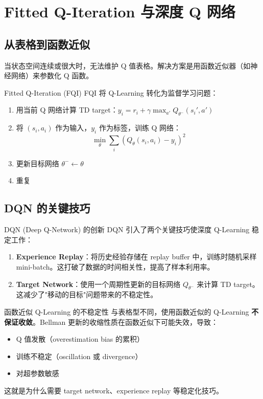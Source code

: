 \section{Fitted Q-Iteration 与深度 Q 网络}

\subsection{从表格到函数近似}

当状态空间连续或很大时，无法维护 Q 值表格。解决方案是用函数近似器（如神经网络）来参数化 Q 函数。

\begin{importantbox}{Fitted Q-Iteration (FQI)}
FQI 将 Q-Learning 转化为监督学习问题：
\begin{enumerate}
    \item 用当前 Q 网络计算 TD target：$y_i = r_i + \gamma \max_{a'} Q_{\theta^-}(s_i', a')$
    \item 将 $(s_i, a_i)$ 作为输入，$y_i$ 作为标签，训练 Q 网络：
    $$\min_\theta \sum_i \left(Q_\theta(s_i, a_i) - y_i\right)^2$$
    \item 更新目标网络 $\theta^- \leftarrow \theta$
    \item 重复
\end{enumerate}
\end{importantbox}

\subsection{DQN 的关键技巧}

\begin{importantbox}{DQN (Deep Q-Network) 的创新}
DQN 引入了两个关键技巧使深度 Q-Learning 稳定工作：
\begin{enumerate}
    \item \textbf{Experience Replay}：将历史经验存储在 replay buffer 中，训练时随机采样 mini-batch。这打破了数据的时间相关性，提高了样本利用率。
    \item \textbf{Target Network}：使用一个周期性更新的目标网络 $Q_{\theta^-}$ 来计算 TD target。这减少了"移动的目标"问题带来的不稳定性。
\end{enumerate}
\end{importantbox}

\begin{warningbox}{函数近似 Q-Learning 的不稳定性}
与表格型不同，使用函数近似的 Q-Learning \textbf{不保证收敛}。Bellman 更新的收缩性质在函数近似下可能失效，导致：
\begin{itemize}
    \item Q 值发散（overestimation bias 的累积）
    \item 训练不稳定（oscillation 或 divergence）
    \item 对超参数敏感
\end{itemize}
这就是为什么需要 target network、experience replay 等稳定化技巧。
\end{warningbox}

